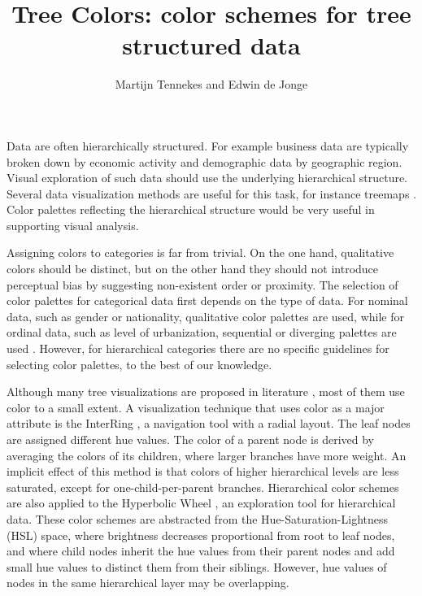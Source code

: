 \documentclass[journal]{vgtc}                %
\title{Tree Colors: color schemes for tree structured data}
\author{Martijn Tennekes and Edwin de Jonge}
\begin{document}
\lstset{language=R}


\maketitle
Data are often hierarchically structured. For example business data are typically broken down by economic activity and demographic data by geographic region. Visual exploration of such data should use the underlying hierarchical structure. Several data visualization methods are useful for this task, for instance treemaps
\cite{shneiderman1992,tennekes2011b}. Color palettes reflecting the hierarchical structure would be very useful in supporting visual analysis.

Assigning colors to categories is far from trivial. On the one hand, qualitative colors should be distinct, but on the other hand they should not introduce perceptual bias by suggesting non-existent order or proximity. The selection of color palettes for categorical data first depends on the type of data. For nominal data, such as gender or nationality, qualitative color palettes are used, while for ordinal data, such as level of urbanization, sequential or diverging palettes are used \cite{brewer03, zeileis2009}. However, for hierarchical categories there are no specific guidelines for selecting color palettes, to the best of our knowledge.

Although many tree visualizations are proposed in literature \cite{schulz2011}, most of them use color to a small extent. A visualization technique that uses color as a major attribute is the InterRing \cite{yang2002}, a navigation tool with a radial layout. The leaf nodes are assigned different hue values. The color of a parent node is derived by averaging the colors of its children, where larger branches have more weight. An implicit effect of this method is that colors of higher hierarchical levels are less saturated, except for one-child-per-parent branches. Hierarchical color schemes are also applied to the Hyperbolic Wheel \cite{lam2012}, an exploration tool for hierarchical data.  These color schemes are abstracted from the Hue-Saturation-Lightness (HSL) space, where brightness decreases proportional from root to leaf nodes, and where child nodes inherit the hue values from their parent nodes and add small hue values to distinct them from their siblings. However, hue values of nodes in the same hierarchical layer may be overlapping.
\end{document}
